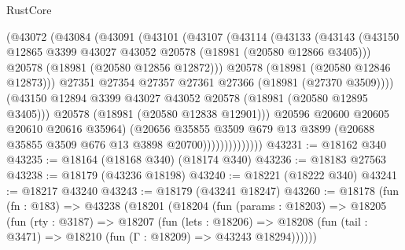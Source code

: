 \begin{lexlean}{RustCore}
\begin{coremodule}
                        (@43072
                          (@43084
                            (@43091
                              (@43101
                                (@43107
                                  (@43114
                                    (@43133
                                      (@43143
                                        (@43150
                                          @12865
                                          @3399
                                          @43027
                                          @43052
                                          @20578
                                          (@18981 (@20580 @12866 @3405)))
                                        @20578
                                        (@18981 (@20580 @12856 @12872)))
                                      @20578
                                      (@18981 (@20580 @12846 @12873)))
                                    @27351
                                    @27354
                                    @27357
                                    @27361
                                    @27366
                                    (@18981 (@27370 @3509))))
                                (@43150
                                  @12894
                                  @3399
                                  @43027
                                  @43052
                                  @20578
                                  (@18981 (@20580 @12895 @3405)))
                                @20578
                                (@18981 (@20580 @12838 @12901)))
                              @20596
                              @20600
                              @20605
                              @20610
                              @20616
                              @35964)
                            (@20656
                              @35855
                              @3509
                              @679
                              @13
                              @3899
                              (@20688 @35855 @3509 @676 @13 @3898 @20700))))))))))))))
@43231 := @18162 @340
@43235 := @18164 (@18168 @340) (@18174 @340)
@43236 := @18183 @27563
@43238 := @18179 (@43236 @18198)
@43240 := @18221 (@18222 @340)
@43241 := @18217 @43240
@43243 := @18179 (@43241 @18247)
@43260 := @18178
    (fun (fn : @183) =>
    @43238
      (@18201
        (@18204
          (fun (params : @18203) =>
          @18205
            (fun (rty : @3187) =>
            @18207
              (fun (lets : @18206) =>
              @18208 (fun (tail : @3471) => @18210 (fun (Γ : @18209) => @43243 @18294))))))

\end{coremodule}
\end{lexlean}
